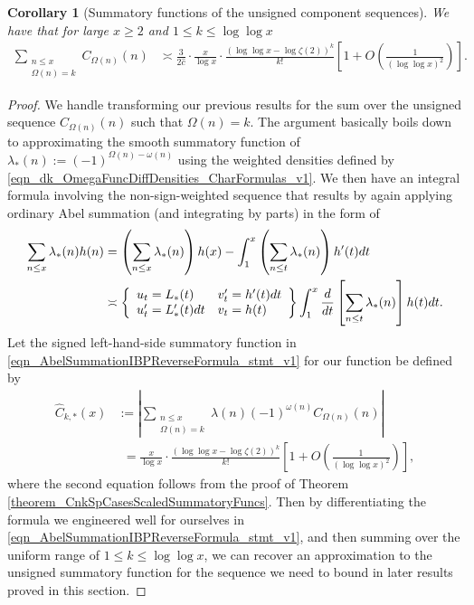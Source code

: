 \documentclass[11pt,reqno,a4letter]{article}
\numberwithin{figure}{section}
\numberwithin{table}{section}
\theoremstyle{plain}
\newtheorem{cor}[theorem]{Corollary}
\numberwithin{theorem}{section}
\theoremstyle{definition}
\begin{document}
\begin{cor}[Summatory functions of the unsigned component sequences] 
\label{cor_SummatoryFuncsOfUnsignedSeqs_v2} 
We have that for large $x \geq 2$ and $1 \leq k \leq \log\log x$ 
\begin{align*} 
\sum_{\substack{n \leq x \\ \Omega(n) = k}} C_{\Omega(n)}(n) & \asymp 
    \frac{3}{2\hat{c}} \cdot \frac{x}{\log x} \cdot 
     \frac{(\log\log x - \log\zeta(2))^{k}}{k!} \left[1 + O\left(\frac{1}{(\log\log x)^2}\right) 
     \right]. 
\end{align*} 
\end{cor} 
\begin{proof} 
We handle transforming our previous results for the sum over the unsigned sequence 
$C_{\Omega(n)}(n)$ such that $\Omega(n) = k$. 
The argument basically boils down to approximating the smooth summatory function of 
$\lambda_{\ast}(n) := (-1)^{\Omega(n) - \omega(n)}$ using the weighted 
densities defined by \eqref{eqn_dk_OmegaFuncDiffDensities_CharFormulas_v1}. 
We then have an integral formula involving the non-sign-weighted 
sequence that results by again 
applying ordinary Abel summation (and integrating by parts) in the form of 
\begin{align} 
\label{eqn_AbelSummationIBPReverseFormula_stmt_v1} 
\sum_{n \leq x} \lambda_{\ast}(n) h(n) & = \left(\sum_{n \leq x} \lambda_{\ast}(n)\right) h(x) - 
     \int_{1}^{x} \left(\sum_{n \leq t} \lambda_{\ast}(n)\right) h^{\prime}(t) dt \\ 
\notag 
     & \asymp \left\{\begin{array}{ll} 
     u_t = L_{\ast}(t) & v_t^{\prime} = h^{\prime}(t) dt \\ 
     u_t^{\prime} = L_{\ast}^{\prime}(t) dt & v_t = h(t) 
     \end{array} 
     \right\} 
     \int_1^{x} \frac{d}{dt}\left[\sum_{n \leq t} \lambda_{\ast}(n)\right] h(t) dt. 
\end{align} 
Let the signed left-hand-side summatory function in 
\eqref{eqn_AbelSummationIBPReverseFormula_stmt_v1} for our function be defined by 
\begin{align*} 
\widehat{C}_{k,\ast}(x) & := \left\lvert \sum_{\substack{n \leq x \\ \Omega(n)=k}} 
     \lambda(n) (-1)^{\omega(n)} C_{\Omega(n)}(n) \right\rvert \\ 
     & \phantom{:} = 
     \frac{x}{\log x} \cdot \frac{(\log\log x - \log\zeta(2))^{k}}{k!} \left[ 
     1 + O\left(\frac{1}{(\log\log x)^2}\right)\right], 
\end{align*} 
where the second equation follows from the proof of 
Theorem \ref{theorem_CnkSpCasesScaledSummatoryFuncs}. 
Then by differentiating the formula we engineered well for ourselves in 
\eqref{eqn_AbelSummationIBPReverseFormula_stmt_v1}, and 
then summing over the uniform range of $1 \leq k \leq \log\log x$, 
we can recover an approximation to the unsigned summatory function for the 
sequence we need to bound in later results proved in this section. 


\end{proof}
\end{document}
